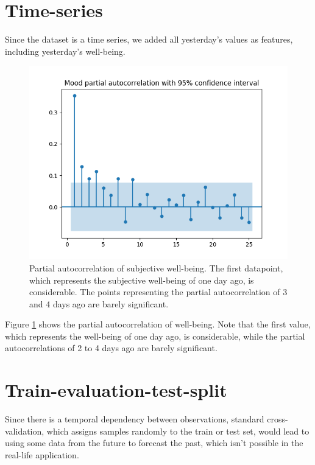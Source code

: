 \documentclass[conference]{IEEEtran}
\begin{document}
\section{Time-series} 
\label{sec:time-series}

Since the dataset is a time series, we added all yesterday's values as features, including yesterday's well-being.

\begin{figure}[htbp]
\begin{center}
\includegraphics[width=1\linewidth]{partial_autocorrelation_025lags_Mood.png}
\caption[Partial autocorrelation]{Partial autocorrelation of subjective well-being. The first datapoint, which represents the subjective well-being of one day ago, is considerable. The points representing the partial autocorrelation of 3 and 4 days ago are barely significant.}
\label{fig:partial_auto_corr}
\end{center}
\end{figure}


Figure \ref{fig:partial_auto_corr} shows the partial autocorrelation of well-being. Note that the first value, which represents the well-being of one day ago, is considerable, while the partial autocorrelations of 2 to 4 days ago are barely significant.

\section{Train-evaluation-test-split}
Since there is a temporal dependency between observations, standard cross-validation, which assigns samples randomly to the train or test set, would lead to using some data from the future to forecast the past, which isn't possible in the real-life application. 
\end{document}
